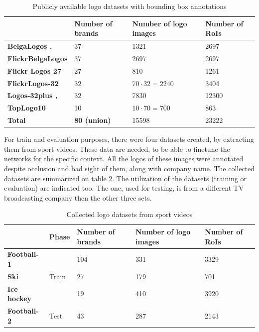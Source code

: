 \bigbreak
\begin{table}[ht!]
\centering
\begin{tabular}{|l|l|l|l|}
\hline & \textbf{Number of brands} & \textbf{Number of logo images} & \textbf{Number of RoIs} \\
\hline
\textbf{BelgaLogos \cite{belgalogos09}, \cite{letessier2012scalable}} & 37 & 1321 & 2697 \\
\hline
\textbf{FlickrBelgaLogos \cite{letessier2012scalable}} & 37 & 2697 & 2697 \\
\hline
\textbf{Flickr Logos 27 \cite{619}} & 27 & 810 & 1261 \\
\hline
\textbf{FlickrLogos-32 \cite{RombergICMR2011}} & 32 & $70 \cdot 32 = 2240$ & 3404 \\
\hline
\textbf{Logos-32plus \cite{bianco2017deep}, \cite{bianco2015logo}} & 32 & 7830 & 12300 \\
\hline
\textbf{TopLogo10 \cite{DBLP:journals/corr/SuZG16}} & 10 & $10 \cdot 70 = 700$ & 863 \\
\hline\hline
\textbf{Total} & \textbf{80 (union)} & 15598 & 23222 \\ \hline
\end{tabular}
\caption{Publicly available logo datasets with bounding box annotations}
\label{table:logodatasets}
\end{table}
\bigbreak
For train and evaluation purposes, there were four datasets created, by extracting them from sport videos. These data are needed, to be able to finetune the networks for the specific context. All the logos of these images were annotated despite occlusion and bad sight of them, along with company name. The collected datasets are summarized on table \ref{table:ownlogodatasets}. The utilization of the datasets (training or evaluation) are indicated too. The one, used for testing, is from a different TV broadcasting company then the other three sets.
\bigbreak
\begin{table}[ht!]
\centering
\begin{tabular}{|l|l|l|l|l|}
\hline & \textbf{Phase} & \textbf{Number of brands} & \textbf{Number of logo images} & \textbf{Number of RoIs} \\
\hline
\multicolumn{1}{|l|}{\textbf{Football-1}} & \multirow{3}{*}{Train} & \multicolumn{1}{l|}{104} & \multicolumn{1}{l|}{331} & \multicolumn{1}{l|}{3329} \\\cline{1-1}\cline{3-5}
\multicolumn{1}{|l|}{\textbf{Ski}} & & \multicolumn{1}{l|}{27} & \multicolumn{1}{l|}{179} & \multicolumn{1}{l|}{701} \\\cline{1-1}\cline{3-5}
\multicolumn{1}{|l|}{\textbf{Ice hockey}} & & \multicolumn{1}{l|}{19} & \multicolumn{1}{l|}{410} & \multicolumn{1}{l|}{3920} \\\hline
\textbf{Football-2} & Test & 43 & 287 & 2143 \\ \hline
\end{tabular}
\caption{Collected logo datasets from sport videos}
\label{table:ownlogodatasets}
\end{table}
\bigbreak
